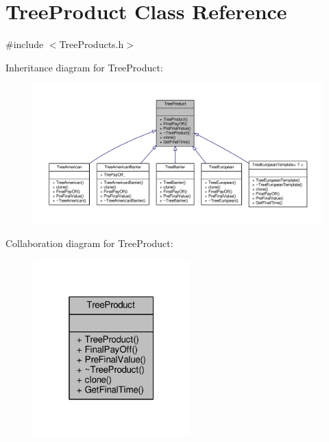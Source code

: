 \hypertarget{classTreeProduct}{}\section{Tree\+Product Class Reference}
\label{classTreeProduct}


{\ttfamily \#include $<$Tree\+Products.\+h$>$}



Inheritance diagram for Tree\+Product\+:
\nopagebreak
\begin{figure}[H]
\begin{center}
\leavevmode
\includegraphics[width=350pt]{classTreeProduct__inherit__graph}
\end{center}
\end{figure}


Collaboration diagram for Tree\+Product\+:
\nopagebreak
\begin{figure}[H]
\begin{center}
\leavevmode
\includegraphics[width=172pt]{classTreeProduct__coll__graph}
\end{center}
\end{figure}
